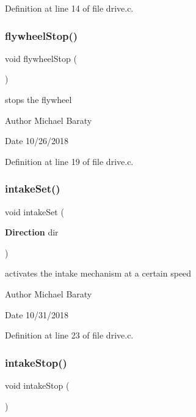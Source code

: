 Definition at line 14 of file drive.\+c.

\mbox{\label{drive_8h_a6889fbcc0c9811401a9339e1bafbf467}} 
\subsubsection{flywheel\+Stop()}
{\footnotesize\ttfamily void flywheel\+Stop (\begin{DoxyParamCaption}{ }\end{DoxyParamCaption})}



stops the flywheel 

\begin{DoxyAuthor}{Author}
Michael Baraty 
\end{DoxyAuthor}
\begin{DoxyDate}{Date}
10/26/2018 
\end{DoxyDate}


Definition at line 19 of file drive.\+c.

\mbox{\label{drive_8h_a80d5e8b6ad5f4ebc5e22d2c179537aa8}} 
\subsubsection{intake\+Set()}
{\footnotesize\ttfamily void intake\+Set (\begin{DoxyParamCaption}\item[{\textbf{ Direction}}]{dir }\end{DoxyParamCaption})}



activates the intake mechanism at a certain speed 

\begin{DoxyAuthor}{Author}
Michael Baraty 
\end{DoxyAuthor}
\begin{DoxyDate}{Date}
10/31/2018 
\end{DoxyDate}


Definition at line 23 of file drive.\+c.

\mbox{\label{drive_8h_a62c5f4e08161e15214b78686e675aabb}} 
\subsubsection{intake\+Stop()}
{\footnotesize\ttfamily void intake\+Stop (\begin{DoxyParamCaption}{ }\end{DoxyParamCaption})}



